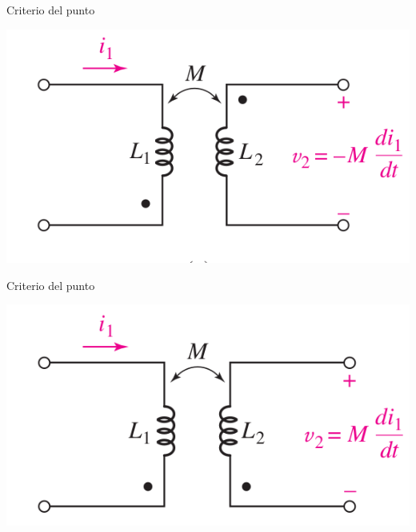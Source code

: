\documentclass[xcolor={usenames,svgnames,dvipsnames}]{beamer}
\begin{document}
\begin{frame}[label={sec:org0cedcf0}]{Criterio del punto}
\begin{center}
\includegraphics[width=.9\linewidth]{figs/punto3.png}
\end{center}
\end{frame}
\begin{frame}[label={sec:orgb489ea9}]{Criterio del punto}
\begin{center}
\includegraphics[width=.9\linewidth]{figs/punto4.png}
\end{center}
\end{frame}
\end{document}
